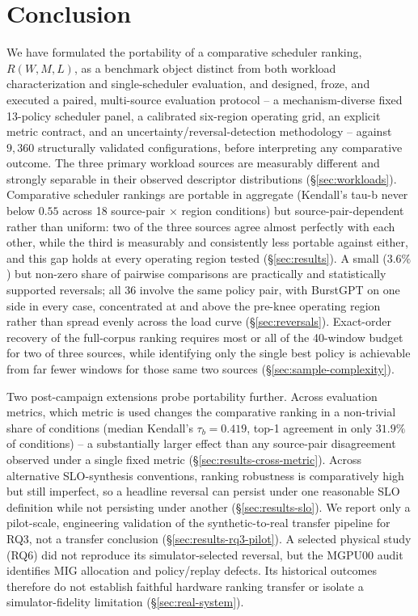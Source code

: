 \section{Conclusion}
\label{sec:conclusion}

We have formulated the portability of a comparative scheduler ranking,
$R(W, M, L)$, as a benchmark object distinct from both workload
characterization and single-scheduler evaluation, and designed, froze, and
executed a paired, multi-source evaluation protocol -- a mechanism-diverse
fixed 13-policy scheduler panel, a calibrated six-region operating grid, an
explicit metric contract, and an uncertainty/reversal-detection
methodology -- against $9{,}360$ structurally validated configurations, before
interpreting any comparative outcome. The three primary workload sources
are measurably different and strongly separable in their observed
descriptor distributions (\S\ref{sec:workloads}). Comparative scheduler
rankings are portable in aggregate (Kendall's tau-b never below $0.55$
across 18 source-pair $\times$ region conditions) but source-pair-dependent
rather than uniform: two of the three sources agree almost perfectly with
each other, while the third is measurably and consistently less portable
against either, and this gap holds at every operating region tested
(\S\ref{sec:results}). A small ($3.6\%$) but non-zero share of pairwise
comparisons are practically and statistically supported reversals; all
$36$ involve the same policy pair, with BurstGPT on one side in every
case, concentrated at and above the pre-knee operating region rather than
spread evenly across the load curve (\S\ref{sec:reversals}). Exact-order recovery
of the full-corpus ranking requires most or all of the 40-window budget
for two of three sources, while identifying only the single best policy is
achievable from far fewer windows for those same two sources
(\S\ref{sec:sample-complexity}).

Two post-campaign extensions probe portability further. Across
evaluation metrics, which metric is used changes the comparative ranking
in a non-trivial share of conditions (median Kendall's $\tau_b = 0.419$,
top-1 agreement in only $31.9\%$ of conditions) -- a substantially larger
effect than any source-pair disagreement observed under a single fixed
metric (\S\ref{sec:results-cross-metric}). Across alternative
SLO-synthesis conventions, ranking robustness is comparatively high but
still imperfect, so a headline reversal can persist under one reasonable
SLO definition while not persisting under another
(\S\ref{sec:results-slo}). We report only a pilot-scale, engineering
validation of the synthetic-to-real transfer pipeline for RQ3, not a
transfer conclusion (\S\ref{sec:results-rq3-pilot}). A selected physical
study (RQ6) did not reproduce its simulator-selected reversal, but the
MGPU00 audit identifies MIG allocation and policy/replay defects. Its
historical outcomes therefore do not establish faithful hardware ranking
transfer or isolate a simulator-fidelity limitation
(\S\ref{sec:real-system}).

